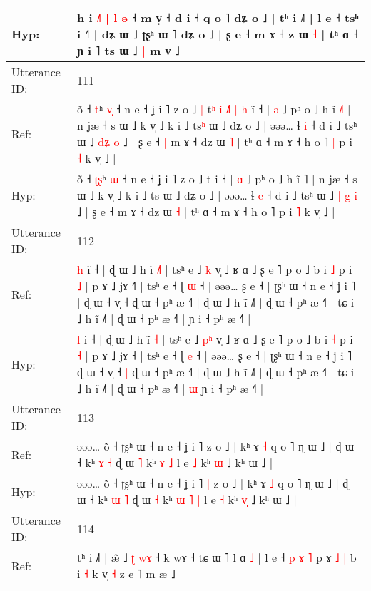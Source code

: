 \documentclass[10pt]{article}
\DeclareRobustCommand{\hl}[1]{{\textcolor{red}{#1}}}
\begin{document}
\begin{longtable}{ll}
 \\
Hyp: & h i\hl{ }\hl{˩}\hl{˥} \hl{|} \hl{l} \hl{ə} ˧ m v̩ ˧ d i ˧ q o ˥ dʑ o ˩ | tʰ i ˩˥ | l e ˧ tsʰ i ˧\hl{˥} | dʑ ɯ ˩ ʈʂʰ ɯ ˥ dʑ o ˩ | ʂ e ˧ m ɤ ˧ \hl{}z ɯ \hl{˧} | tʰ ɑ ˧ ɲ i ˥ ts ɯ ˩\hl{ }\hl{|} m v̩ ˩\hl{}\hl{}
 \\
\midrule
Utterance ID: & 111 \\
Ref: & õ ˧ \hl{}\hl{t}ʰ \hl{v}\hl{̩} ˧ n e ˧ ʝ i ˥ z o ˩\hl{ }\hl{|} t\hl{ʰ}\hl{ }\hl{i}\hl{ }\hl{˩}\hl{˥}\hl{ }\hl{|}\hl{ }\hl{h} i\hl{̃} ˧ | \hl{ə} ˩ pʰ o ˩ h ĩ \hl{˩}˥ | n jæ ˧ s ɯ ˩ k v̩ ˩ k i ˩ ts\hl{ʰ} ɯ ˩ dʑ o ˩ | əəə… ɬ \hl{i} ˧ d i ˩ tsʰ ɯ ˩ \hl{}\hl{d}\hl{ʑ} \hl{o} ˩ | ʂ e ˧\hl{ }\hl{|} m ɤ ˧ dz ɯ \hl{˥} | tʰ ɑ ˧ m ɤ ˧ h o ˥\hl{ }\hl{|} p i \hl{˧} k v̩ ˩ |
 \\
Hyp: & õ ˧ \hl{ʈ}\hl{ʂ}ʰ \hl{}\hl{ɯ} ˧ n e ˧ ʝ i ˥ z o ˩\hl{}\hl{} t\hl{}\hl{}\hl{}\hl{}\hl{}\hl{}\hl{}\hl{}\hl{}\hl{} i\hl{} ˧ | \hl{ɑ} ˩ pʰ o ˩ h ĩ \hl{}˥ | n jæ ˧ s ɯ ˩ k v̩ ˩ k i ˩ ts\hl{} ɯ ˩ dʑ o ˩ | əəə… ɬ \hl{e} ˧ d i ˩ tsʰ ɯ ˩ \hl{|}\hl{ }\hl{g} \hl{i} ˩ | ʂ e ˧\hl{}\hl{} m ɤ ˧ dz ɯ \hl{˧} | tʰ ɑ ˧ m ɤ ˧ h o ˥\hl{}\hl{} p i \hl{˥} k v̩ ˩ |
 \\
\midrule
Utterance ID: & 112 \\
Ref: & \hl{h} i\hl{̃} ˧ | ɖ ɯ ˩ h ĩ \hl{˩}\hl{˥} | tsʰ e ˩ \hl{}\hl{k} v̩ ˩ ʁ ɑ ˩ ʂ e ˥ p o ˩ b i \hl{˩} p i \hl{˩} | p ɤ ˩ jɤ ˧\hl{˥} | tsʰ e ˧ ɭ \hl{ɯ} ˧ | əəə… ʂ e ˧ | ʈʂʰ ɯ ˧ n e ˧ ʝ i ˥ | ɖ ɯ ˧ v̩ ˧\hl{}\hl{} ɖ ɯ ˧ pʰ æ ˧˥ | ɖ ɯ ˩ h ĩ ˩˥ | ɖ ɯ ˧ pʰ æ ˧˥ | tɕ i ˩ h ĩ ˩˥ | ɖ ɯ ˧ pʰ æ ˧˥ |\hl{}\hl{} ɲ i ˧ pʰ æ ˧˥ |
 \\
Hyp: & \hl{l} i\hl{} ˧ | ɖ ɯ ˩ h ĩ \hl{}\hl{˧} | tsʰ e ˩ \hl{p}\hl{ʰ} v̩ ˩ ʁ ɑ ˩ ʂ e ˥ p o ˩ b i \hl{˧} p i \hl{˧} | p ɤ ˩ jɤ ˧\hl{} | tsʰ e ˧ ɭ \hl{e} ˧ | əəə… ʂ e ˧ | ʈʂʰ ɯ ˧ n e ˧ ʝ i ˥ | ɖ ɯ ˧ v̩ ˧\hl{ }\hl{|} ɖ ɯ ˧ pʰ æ ˧˥ | ɖ ɯ ˩ h ĩ ˩˥ | ɖ ɯ ˧ pʰ æ ˧˥ | tɕ i ˩ h ĩ ˩˥ | ɖ ɯ ˧ pʰ æ ˧˥ |\hl{ }\hl{ɯ} ɲ i ˧ pʰ æ ˧˥ |
 \\
\midrule
Utterance ID: & 113 \\
Ref: & əəə… õ ˧ ʈʂʰ ɯ ˧ n e ˧ ʝ i ˥\hl{}\hl{} z o ˩ | kʰ ɤ \hl{˧} q o ˥ ɳ ɯ ˩ | ɖ ɯ ˧ kʰ \hl{ɤ} \hl{˧} ɖ ɯ \hl{˥} kʰ\hl{}\hl{} \hl{ɤ} \hl{˩} l e \hl{˩} kʰ \hl{}\hl{ɯ} ˩ kʰ ɯ ˩ |
 \\
Hyp: & əəə… õ ˧ ʈʂʰ ɯ ˧ n e ˧ ʝ i ˥\hl{ }\hl{|} z o ˩ | kʰ ɤ \hl{˩} q o ˥ ɳ ɯ ˩ | ɖ ɯ ˧ kʰ \hl{ɯ} \hl{˥} ɖ ɯ \hl{˧} kʰ\hl{ }\hl{ɯ} \hl{˥} \hl{|} l e \hl{˧} kʰ \hl{v}\hl{̩} ˩ kʰ ɯ ˩ |
 \\
\midrule
Utterance ID: & 114 \\
Ref: & tʰ i ˩˥ | æ\hl{̃} ˩ \hl{ʈ} \hl{w}\hl{ɤ} ˧ k wɤ ˧ tɕ ɯ ˥ l ɑ\hl{ }\hl{˩} | l e ˧\hl{ }\hl{p}\hl{ }\hl{ɤ}\hl{ }\hl{˥} p ɤ\hl{ }\hl{˩} \hl{|} b i \hl{˧} k v̩ \hl{˧} z e ˥ m æ ˩ |

\end{longtable}
\end{document}
